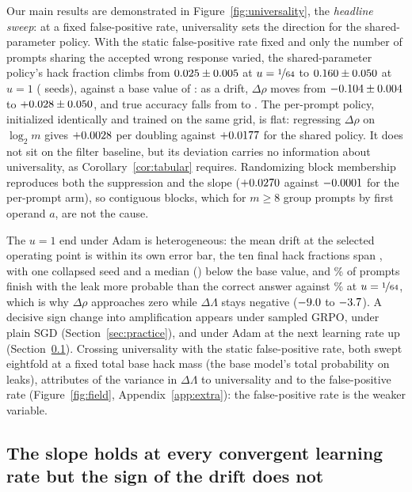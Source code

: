 \documentclass{article}
\theoremstyle{definition}
\begin{document}
Our main results are demonstrated in Figure~\ref{fig:universality}, the \emph{headline sweep}: at a fixed false-positive rate, universality sets the direction for the shared-parameter policy. With the static false-positive rate fixed and only the number of prompts sharing the accepted wrong response varied, the shared-parameter policy's hack fraction climbs from $0.025{}\pm0.005{}$ at $u=\nicefrac{1}{64}$ to $0.160{}\pm0.050{}$ at $u=1$ (\NuTwoNSeeds{} seeds), against a base value of \NuTwoBaseRhoMean{}: as a drift, $\Delta\rho$ moves from $-0.104{}\pm0.004{}$ to $+0.028{}\pm0.050{}$, and true accuracy falls from \NuTwoNeuralLoAcc{} to \NuTwoNeuralHiAcc{}. The per-prompt policy, initialized identically and trained on the same grid, is flat: regressing $\Delta\rho$ on $\log_2 m$ gives $+0.0028{}$ per doubling against $+0.0177{}$ for the shared policy. It does not sit on the filter baseline, but its deviation carries no information about universality, as Corollary~\ref{cor:tabular} requires. Randomizing block membership reproduces both the suppression and the slope ($+0.0270{}$ against $-0.0001{}$ for the per-prompt arm), so contiguous blocks, which for $m\geq8$ group prompts by first operand $a$, are not the cause.

The $u=1$ end under Adam is heterogeneous: the mean drift at the selected operating point is within its own error bar, the ten final hack fractions span \NuTwoHiSeedList{}, with one collapsed seed and a median (\NuTwoHiSeedMedian{}) below the base value, and \NuTwoFlipHi{}\% of prompts finish with the leak more probable than the correct answer against \NuTwoFlipLo{}\% at $u=\nicefrac{1}{64}$, which is why $\Delta\rho$ approaches zero while $\Delta\Lambda$ stays negative ($-9.0{}$ to $-3.7{}$). A decisive sign change into amplification appears under sampled GRPO, under plain SGD (Section~\ref{sec:practice}), and under Adam at the next learning rate up (Section~\ref{sec:lr}). Crossing universality with the static false-positive rate, both swept eightfold at a fixed total base hack mass (the base model's total probability on leaks), attributes \NuThreeEtaM{} of the variance in $\Delta\Lambda$ to universality and \NuThreeEtaK{} to the false-positive rate (Figure~\ref{fig:field}, Appendix~\ref{app:extra}): the false-positive rate is the weaker variable.

\subsection{The slope holds at every convergent learning rate but the sign of the drift does not}
\label{sec:lr}
\end{document}
